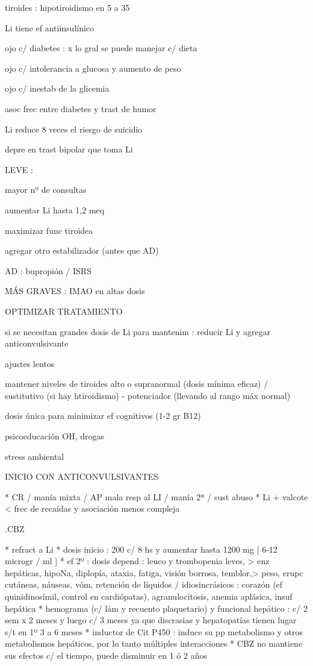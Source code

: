 \documentclass{scrbook}
\begin{document}
tiroides : hipotiroidismo en 5 a 35%

Li tiene ef antiinsulínico

ojo c/ diabetes : x lo gral se puede manejar c/ dieta

ojo c/ intolerancia a glucosa y aumento de peso

ojo c/ inestab de la glicemia

asoc frec entre diabetes y trast de humor

Li reduce 8 veces el riesgo de suicidio

depre en trast bipolar que toma Li

LEVE :

mayor nº de consultas

aumentar Li hasta 1,2 meq

maximizar func tiroidea

agregar otro estabilizador (antes que AD)

AD : bupropión / ISRS

MÁS GRAVES : IMAO en altas dosis

OPTIMIZAR TRATAMIENTO

si se necesitan grandes dosis de Li para mantenim : reducir Li y agregar anticonvulsivante

ajustes lentos

mantener niveles de tiroides alto o supranormal (dosis mínima eficaz) / sustitutivo (si hay htiroidismo) - potenciador (llevando al rango máx normal)

dosis única para minimizar ef cognitivos (1-2 gr B12)

psicoeducación OH, drogas

stress ambiental

INICIO CON ANTICONVULSIVANTES

* CR / manía mixta / AP mala resp al LI / manía 2ª / sust abuso
* Li + valcote < frec de recaídas y asociación menos compleja

.CBZ

* refract a Li
* dosis inicio : 200 c/ 8 hs y aumentar hasta 1200 mg [ 6-12 microgr / ml ]
* ef 2º : dosis depend : leuco y trombopenia leves, > enz hepáticas, hipoNa, diplopía, ataxia, fatiga, visión borrosa, temblor,> peso, erupc cutáneas, náuseas, vóm, retención de líquidos / idiosincrásicos : corazón (ef quinidinosímil, control en cardiópatas), agranulocitosis, anemia aplásica, insuf hepática
* hemograma (c/ lám y recuento plaquetario) y funcional hepático : c/ 2 sem x 2 meses y luego c/ 3 meses ya que discrasias y hepatopatías tienen lugar s/t en 1º 3 a 6 meses
* inductor de Cit P450 : induce su pp metabolismo y otros metabolismos hepáticos, por lo tanto múltiples interacciones
* CBZ no mantiene sus efectos c/ el tiempo, puede disminuir en 1 ó 2 años
\end{document}
